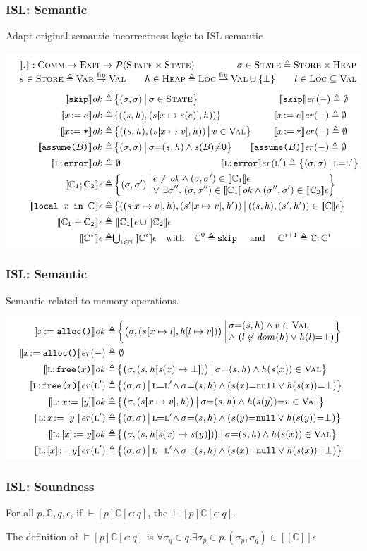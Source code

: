 \documentclass[11pt]{beamer}
\begin{document}
\begin{frame}\frametitle{ISL: Semantic}
Adapt original semantic incorrectness logic to ISL semantic 
\begin{center}
\includegraphics[scale=0.3]{adapt1.png}
\end{center}
\end{frame}



\begin{frame}\frametitle{ISL: Semantic}

Semantic related to memory operations.

\begin{center}
\includegraphics[scale=0.3]{adapt2.png}
\end{center}
\end{frame}

\begin{frame}\frametitle{ISL: Soundness}
\begin{theorem}
For all $p, \mathbb{C}, q, \epsilon$, if $\vdash [p]\mathbb{ C }[\epsilon:q]$, the $\models [p] \mathbb{C} [\epsilon: q]$.
\end{theorem}
The definition of $\models [p] \mathbb{C} [\epsilon: q]$ is $\forall \sigma_q\in q. \exists \sigma_p\in p. (\sigma_p, \sigma_q)\in [[\mathbb{C}]]\epsilon$
\end{frame}
\end{document}
